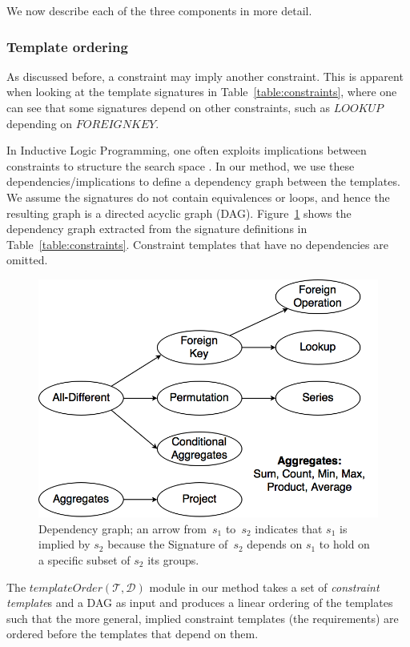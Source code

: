\documentclass{sig-alternate-05-2015}
\newcommand{\constraints}{\ensuremath{\mathcal{T}}\xspace}
\newcommand{\format}[1]{\textit{#1}\xspace}
\newcommand{\constrainttorder}{\format{templateOrder}}
\newcommand{\template}{\format{constraint template}}
\newcommand{\CSignature}{Signature\xspace}
\newcommand{\dependencies}{\ensuremath{\mathcal{D}}\xspace}
\begin{document}
We now describe each of the three components in more detail.

\subsubsection{Template ordering}
As discussed before, a constraint may imply another constraint. This is apparent when looking at the template signatures in Table~\ref{table:constraints}, where one can see that some signatures depend on other constraints, such as $LOOKUP$ depending on $FOREIGNKEY$.

In Inductive Logic Programming, one often exploits implications between constraints to structure the search space \cite{luc_book}.
In our method, we use these dependencies/implications to define a dependency graph between the templates. We assume the signatures do not contain equivalences or loops, and hence the resulting graph is a directed acyclic graph (DAG).
Figure~\ref{fig:learning_order} shows the dependency graph extracted from the signature definitions in Table~\ref{table:constraints}. 
Constraint templates that have no dependencies are omitted. 

\begin{figure}[t]
  \centering
  \includegraphics[width=0.8\linewidth]{figures/constraint_dependency.png}
  \caption{Dependency graph; an arrow from~$s_1$ to~$s_2$ indicates that $s_1$ is implied by $s_2$ because the \CSignature of~$s_2$ depends on $s_1$ to hold on a specific subset of $s_2$ its groups.
  }
  \label{fig:learning_order}
\end{figure}

The $\constrainttorder(\constraints,\dependencies)$ module in our method takes a set of {\template}s and a DAG as input and produces a linear ordering of the templates such that the more general, implied constraint templates (the requirements) are ordered before the templates that depend on them.
\end{document}
